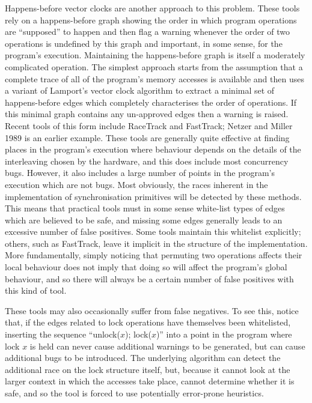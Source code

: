 Happens-before vector clocks are another approach to this problem.
These tools rely on a happens-before graph showing the order in which
program operations are ``supposed'' to happen and then flag a warning
whenever the order of two operations is undefined by this graph and
important, in some sense, for the program's execution.  Maintaining
the happens-before graph is itself a moderately complicated operation.
The simplest approach starts from the assumption that a complete trace
of all of the program's memory accesses is available and then uses a
variant of Lamport's vector clock algorithm\needCite{} to extract a
minimal set of happens-before edges which completely characterises the
order of operations.  If this minimal graph contains any un-approved
edges then a warning is raised.  Recent tools of this form
include RaceTrack\needCite{} and FastTrack\needCite{}; Netzer and
Miller 1989\needCite{} is an earlier example.  These tools are
generally quite effective at finding places in the program's execution
where behaviour depends on the details of the interleaving chosen by
the hardware, and this does include most concurrency bugs.  However,
it also includes a large number of points in the program's execution
which are not bugs.  Most obviously, the races inherent in the
implementation of synchronisation primitives will be detected by these
methods.  This means that practical tools must in some sense
white-list types of edges which are believed to be safe, and missing
some edges generally leads to an excessive number of false positives.
Some tools maintain this whitelist explicitly\needCite{}; others, such
as FastTrack, leave it implicit in the structure of the
implementation.  More fundamentally, simply noticing that permuting
two operations affects their local behaviour does not imply that doing
so will affect the program's global behaviour, and so there will
always be a certain number of false positives with this kind of tool.

These tools may also occasionally suffer from false negatives.  To see
this, notice that, if the edges related to lock operations have
themselves been whitelisted, inserting the sequence ``unlock($x$);
lock($x$)'' into a point in the program where lock $x$ is held can
never cause additional warnings to be generated, but can cause
additional bugs to be introduced.  The underlying algorithm can detect
the additional race on the lock structure itself, but, because it
cannot look at the larger context in which the accesses take place,
cannot determine whether it is safe, and so the tool is forced to use
potentially error-prone heuristics.

